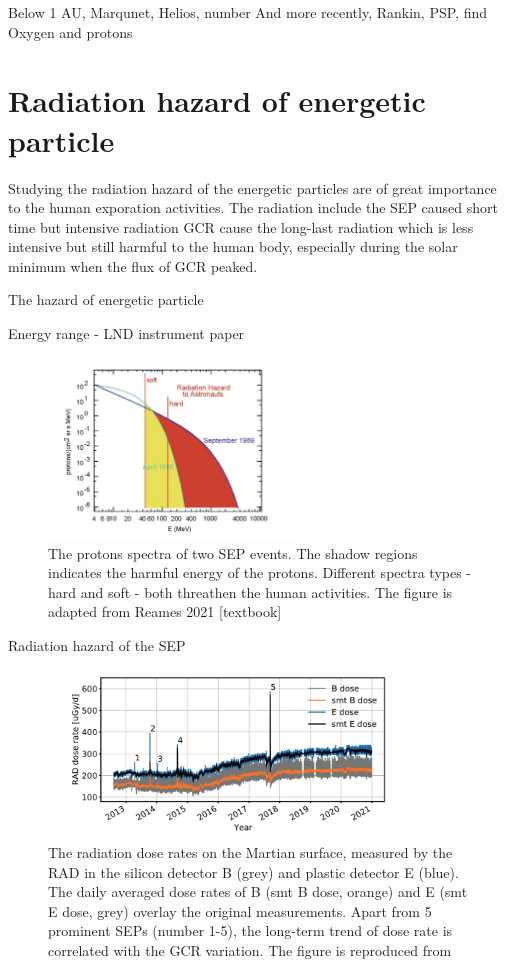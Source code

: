 Below 1 AU, Marqunet, Helios, number 
And more recently, Rankin, PSP, find Oxygen and protons

\section{Radiation hazard of energetic particle}

Studying the radiation hazard of the energetic particles are of great importance to the human exporation activities.
The radiation include the SEP caused short time but intensive radiation
GCR cause the long-last radiation which is less intensive but still harmful to the human body, especially during the solar minimum when the flux of GCR peaked.

The hazard of energetic particle 

Energy range - LND instrument paper

\begin{figure}
	\centering
	\includegraphics[width = 0.6\textwidth]{images/SEP-radiation_hazard.png}
	\caption{The protons spectra of two SEP events. The shadow regions indicates the harmful energy of the protons. Different spectra types - hard and soft - both threathen the human activities. The figure is adapted from Reames 2021 [textbook]}
	\label{Fig:SEP-radiation_hazard}
\end{figure}
Radiation hazard of the SEP 


\begin{figure}
	\centering
	\includegraphics[width = 0.9\textwidth]{images/Rad_GCR_radiation.png}

	\caption{The radiation dose rates on the Martian surface, measured by the \ac{RAD} in the silicon detector B (grey) and plastic detector E (blue). The daily averaged dose rates of B (smt B dose, orange) and E (smt E dose, grey) overlay the original measurements. Apart from 5 prominent SEPs (number 1-5), the long-term trend of dose rate is correlated with the \ac{GCR} variation. The figure is reproduced from \citep{Guo2021AARv_rad}}
	\label{Fig:Rad_GCR_radiation}
\end{figure}
	
